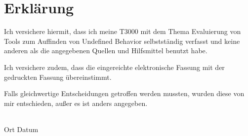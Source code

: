 \chapter*{Erklärung}
\label{ch:erklaerung}

Ich versichere hiermit, dass ich meine 
T3000
 mit dem Thema 
\glqq{}Evaluierung von Tools zum Auffinden von Undefined Behavior\grqq{}
 selbstständig verfasst und keine anderen als die angegebenen Quellen und Hilfsmittel benutzt habe.

Ich versichere zudem, dass die eingereichte elektronische Fassung mit der gedruckten Fassung übereinstimmt.

Falls gleichwertige Entscheidungen getroffen werden mussten, wurden diese von mir
entschieden, außer es ist anders angegeben.

\vspace{2.0cm}
\underline{\hspace{12cm}}\\
Ort \hspace{3cm} Datum \hspace{2cm} 
\makeatletter
\@author
\makeatother